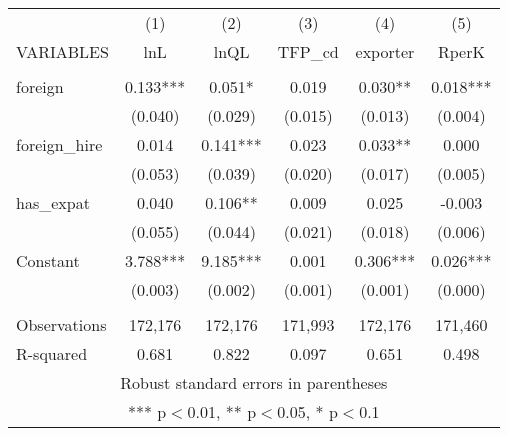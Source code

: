 \begin{tabular}{lccccc} \hline
 & (1) & (2) & (3) & (4) & (5) \\
VARIABLES & lnL & lnQL & TFP\_cd & exporter & RperK \\ \hline
 &  &  &  &  &  \\
foreign & 0.133*** & 0.051* & 0.019 & 0.030** & 0.018*** \\
 & (0.040) & (0.029) & (0.015) & (0.013) & (0.004) \\
foreign\_hire & 0.014 & 0.141*** & 0.023 & 0.033** & 0.000 \\
 & (0.053) & (0.039) & (0.020) & (0.017) & (0.005) \\
has\_expat & 0.040 & 0.106** & 0.009 & 0.025 & -0.003 \\
 & (0.055) & (0.044) & (0.021) & (0.018) & (0.006) \\
Constant & 3.788*** & 9.185*** & 0.001 & 0.306*** & 0.026*** \\
 & (0.003) & (0.002) & (0.001) & (0.001) & (0.000) \\
 &  &  &  &  &  \\
Observations & 172,176 & 172,176 & 171,993 & 172,176 & 171,460 \\
 R-squared & 0.681 & 0.822 & 0.097 & 0.651 & 0.498 \\ \hline
\multicolumn{6}{c}{ Robust standard errors in parentheses} \\
\multicolumn{6}{c}{ *** p$<$0.01, ** p$<$0.05, * p$<$0.1} \\
\end{tabular}
